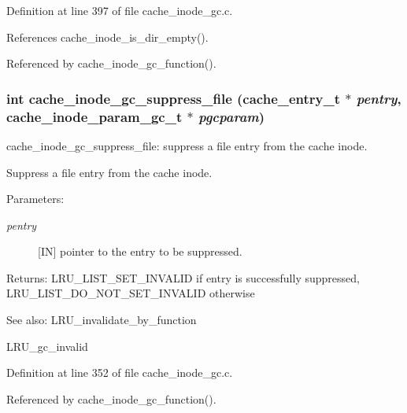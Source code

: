 Definition at line 397 of file cache\_\-inode\_\-gc.c.

References cache\_\-inode\_\-is\_\-dir\_\-empty().

Referenced by cache\_\-inode\_\-gc\_\-function().
\subsubsection{\setlength{\rightskip}{0pt plus 5cm}int cache\_\-inode\_\-gc\_\-suppress\_\-file (cache\_\-entry\_\-t $\ast$ {\em pentry}, cache\_\-inode\_\-param\_\-gc\_\-t $\ast$ {\em pgcparam})}\label{group__Cache__inode__gc__internal_ga2}


cache\_\-inode\_\-gc\_\-suppress\_\-file: suppress a file entry from the cache inode.

Suppress a file entry from the cache inode.

\begin{Desc}
\item[Parameters:]
\begin{description}
\item[{\em pentry}][IN] pointer to the entry to be suppressed.\end{description}
\end{Desc}
\begin{Desc}
\item[Returns:]LRU\_\-LIST\_\-SET\_\-INVALID if entry is successfully suppressed, LRU\_\-LIST\_\-DO\_\-NOT\_\-SET\_\-INVALID otherwise\end{Desc}
\begin{Desc}
\item[See also:]LRU\_\-invalidate\_\-by\_\-function 

LRU\_\-gc\_\-invalid \end{Desc}


Definition at line 352 of file cache\_\-inode\_\-gc.c.

Referenced by cache\_\-inode\_\-gc\_\-function().